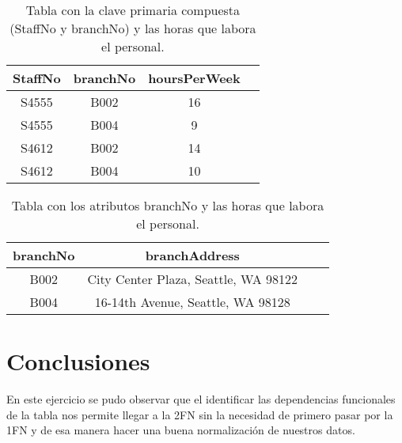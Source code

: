 \documentclass[spanish]{article}
\begin{document}
    \newpage
		\begin{table}[ht]
	    \centering
	    \begin{tabular}{|c|c|c|l|}
	    \hline
	    \rowcolor{LightBlue2}
	    \textbf{StaffNo} & \textbf{branchNo} & \textbf{hoursPerWeek}\\ \hline
	        S4555 &  B002 & 16\\ \hline
	        S4555 &  B004 & 9\\ \hline
	        S4612 &  B002 & 14\\ \hline
	        S4612 &  B004 & 10\\ \hline
	    \end{tabular} 
	    \caption{Tabla con la clave primaria compuesta (StaffNo y branchNo) y las horas que labora el personal.}
	    \label{tab:Horas}
	\end{table}
	
	
			\begin{table}[ht]
	    \centering
	    \begin{tabular}{|c|c|c|l|}
	    \hline
	    \rowcolor{LightBlue2}
	    \textbf{branchNo} & \textbf{branchAddress}\\ \hline
	       B002 & City Center Plaza, Seattle, WA 98122\\ \hline
	       B004 & 16-14th Avenue, Seattle, WA 98128\\ \hline
	    \end{tabular} 
	    \caption{Tabla con los atributos branchNo y las horas que labora el personal.}
	    \label{tab:Horas}
	\end{table}
    
\section{Conclusiones}
En este ejercicio se pudo observar que el identificar las dependencias funcionales de la tabla nos permite llegar a la 2FN sin la necesidad de primero pasar por la 1FN y de esa manera hacer una buena normalización de nuestros datos.
\end{document}
